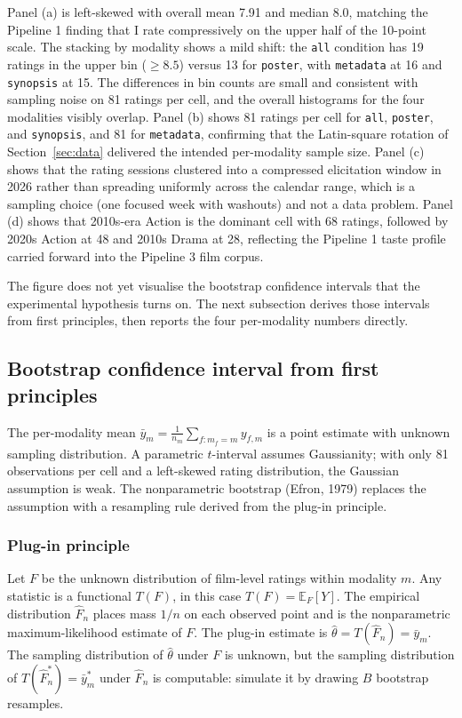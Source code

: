 \documentclass{article}
\begin{document}
Panel (a) is left-skewed with overall mean 7.91 and median 8.0, matching the Pipeline 1 finding that I rate compressively on the upper half of the 10-point scale. The stacking by modality shows a mild shift: the \texttt{all} condition has 19 ratings in the upper bin ($\geq 8.5$) versus 13 for \texttt{poster}, with \texttt{metadata} at 16 and \texttt{synopsis} at 15. The differences in bin counts are small and consistent with sampling noise on 81 ratings per cell, and the overall histograms for the four modalities visibly overlap. Panel (b) shows 81 ratings per cell for \texttt{all}, \texttt{poster}, and \texttt{synopsis}, and 81 for \texttt{metadata}, confirming that the Latin-square rotation of Section~\ref{sec:data} delivered the intended per-modality sample size. Panel (c) shows that the rating sessions clustered into a compressed elicitation window in 2026 rather than spreading uniformly across the calendar range, which is a sampling choice (one focused week with washouts) and not a data problem. Panel (d) shows that 2010s-era Action is the dominant cell with 68 ratings, followed by 2020s Action at 48 and 2010s Drama at 28, reflecting the Pipeline 1 taste profile carried forward into the Pipeline 3 film corpus.

The figure does not yet visualise the bootstrap confidence intervals that the experimental hypothesis turns on. The next subsection derives those intervals from first principles, then reports the four per-modality numbers directly.

\subsection{Bootstrap confidence interval from first principles}

The per-modality mean $\bar y_m = \frac{1}{n_m} \sum_{f : m_f = m} y_{f,m}$ is a point estimate with unknown sampling distribution. A parametric $t$-interval assumes Gaussianity; with only 81 observations per cell and a left-skewed rating distribution, the Gaussian assumption is weak. The nonparametric bootstrap (Efron, 1979) replaces the assumption with a resampling rule derived from the plug-in principle.

\subsubsection*{Plug-in principle}

Let $F$ be the unknown distribution of film-level ratings within modality $m$. Any statistic is a functional $T(F)$, in this case $T(F) = \mathbb{E}_F[Y]$. The empirical distribution $\hat F_n$ places mass $1/n$ on each observed point and is the nonparametric maximum-likelihood estimate of $F$. The plug-in estimate is $\hat\theta = T(\hat F_n) = \bar y_m$. The sampling distribution of $\hat\theta$ under $F$ is unknown, but the sampling distribution of $T(\hat F_n^\ast) = \bar y_m^\ast$ under $\hat F_n$ is computable: simulate it by drawing $B$ bootstrap resamples.
\end{document}
